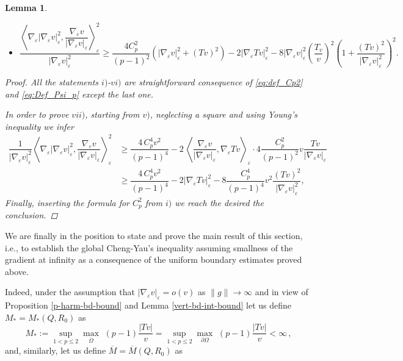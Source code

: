 \documentclass[10pt]{amsart}
\numberwithin{equation}{section}
\newtheorem{lemma}[theorem]{Lemma}
\theoremstyle{definition}
\begin{document}
\begin{lemma}
\begin{itemize}
		\item[vii)]$\dfrac{\left\langle \nabla_{\varepsilon}|\nabla_{\varepsilon}v|_{\varepsilon}^2, \dfrac{\nabla_{\varepsilon}v}{|\nabla_{\varepsilon}v|_{\varepsilon}}\right\rangle_{\varepsilon}^2}{|\nabla_{\varepsilon}v|_{\varepsilon}^2} \geq \dfrac{4C_p^2}{(p-1)^2}(|\nabla_{\varepsilon}v|_{\varepsilon}^2 + (Tv)^{2}) - 2|\nabla_{\varepsilon}Tv|_{\varepsilon}^2 - 8 |\nabla_{\varepsilon}v|_{\varepsilon}^2 \left(\dfrac{T_v}{v}\right)^2 \left(1+ \dfrac{(Tv)^2}{|\nabla_{\varepsilon}v|_{\varepsilon}^2}\right)^{2}.$
	\end{itemize}
	\begin{proof}
	All the statements $i)$-$vi)$ are straightforward consequence of \eqref{eq:def_Cp2} and \eqref{eq:Def_Psi_p} except the last one.

In order to prove $vii)$, starting from $v)$, neglecting a square and using Young's inequality we infer
		\begin{equation}
			\begin{aligned}
				\dfrac{1}{|\nabla_{\varepsilon}v|_{\varepsilon}^2} \left\langle \nabla_{\varepsilon}|\nabla_{\varepsilon}v|_{\varepsilon}^2, \dfrac{\nabla_{\varepsilon}v}{|\nabla_{\varepsilon}v|_{\varepsilon}}\right\rangle_{\varepsilon}^2 &\geq \dfrac{4\, C_p^4 v^2}{(p-1)^4} - 2\,\left\langle \dfrac{\nabla_{\varepsilon}v}{|\nabla_{\varepsilon}v|_{\varepsilon}}, \nabla_{\varepsilon}Tv \right\rangle_{\varepsilon} \cdot  4\dfrac{C_p^2}{(p-1)^2} v \dfrac{Tv}{|\nabla_{\varepsilon}v|_{\varepsilon}}\\
				&\geq \dfrac{4\, C_p^4 v^2}{(p-1)^4} - 2|\nabla_{\varepsilon}Tv|_{\varepsilon}^2 - 8\dfrac{C_p^4}{(p-1)^4}v^2 \dfrac{(Tv)^2}{|\nabla_{\varepsilon}v|_{\varepsilon}^2},							
			\end{aligned}
		\end{equation}
		\noindent  Finally, inserting the formula for $C_p^2$ from $i)$ we reach the desired the conclusion.
	\end{proof}
\end{lemma}

We are finally in the position to state and prove the main result of this section, i.e., to establish the global Cheng-Yau's inequality assuming smallness of the gradient at infinity as a consequence of the uniform boundary estimates proved above.

Indeed, under the assumption that $|\nabla_\varepsilon  v |_\varepsilon=o(v)$ as $\| g\| \to \infty$ and in view of Proposition \ref{p-harm-bd-bound} and Lemma \ref{vert-bd-int-bound} let us define $M_{\ast}=M_{\ast}(Q,R_0)$ as
\begin{equation}\label{eq:def_M_ast}
	M_{\ast} := \sup_{1<p\leq 2} \max_{ \overline{\Omega}} \, \, (p-1)\dfrac{|Tv|}{v}= \sup_{1<p\leq 2} \max_{\partial \Omega} \, \, (p-1)\dfrac{|Tv|}{v} <\infty \, ,
\end{equation} 
and, similarly, let us define $\overline{M}=\overline{M}(Q, R_0)$ as 
\end{document}
